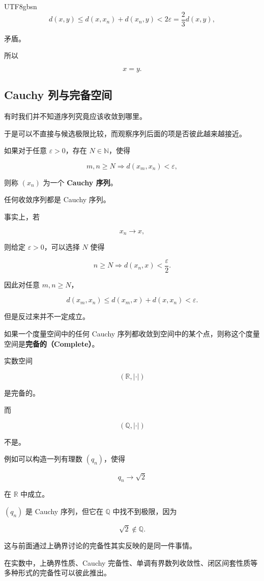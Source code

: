 \documentclass[11pt]{article}
\begin{document}
\begin{CJK*}{UTF8}{gbsn}
\[
d(x,y)\leq d(x,x_{n})+d(x_{n},y)<2\varepsilon=\frac{2}{3}d(x,y),
\]

矛盾。

所以

\[
x=y.
\]

\subsection{Cauchy 列与完备空间}

有时我们并不知道序列究竟应该收敛到哪里。

于是可以不直接与候选极限比较，而观察序列后面的项是否彼此越来越接近。

如果对于任意 $\varepsilon>0$，存在 $N\in\mathbb{N}$，使得

\[
m,n\geq N\Longrightarrow d(x_{m},x_{n})<\varepsilon,
\]

则称 $(x_{n})$ 为一个 \textbf{Cauchy 序列}。

任何收敛序列都是 Cauchy 序列。

事实上，若

\[
x_{n}\rightarrow x,
\]

则给定 $\varepsilon>0$，可以选择 $N$ 使得

\[
n\geq N\Longrightarrow d(x_{n},x)<\frac{\varepsilon}{2}.
\]

因此对任意 $m,n\geq N$，

\[
d(x_{m},x_{n})\leq d(x_{m},x)+d(x,x_{n})<\varepsilon.
\]

但是反过来并不一定成立。

如果一个度量空间中的任何 Cauchy 序列都收敛到空间中的某个点，则称这个度量空间是\textbf{完备的（Complete）}。

实数空间

\[
(\mathbb{R},|\cdot|)
\]

是完备的。

而

\[
(\mathbb{Q},|\cdot|)
\]

不是。

例如可以构造一列有理数 $(q_{n})$，使得

\[
q_{n}\rightarrow\sqrt{2}
\]

在 $\mathbb{R}$ 中成立。

$(q_{n})$ 是 Cauchy 序列，但它在 $\mathbb{Q}$ 中找不到极限，因为

\[
\sqrt{2}\notin\mathbb{Q}.
\]

这与前面通过上确界讨论的完备性其实反映的是同一件事情。

在实数中，上确界性质、Cauchy 完备性、单调有界数列收敛性、闭区间套性质等多种形式的完备性可以彼此推出。


\end{CJK*}
\end{document}
